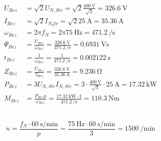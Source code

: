\documentclass[11pt,a4paper]{scrartcl}
\newcommand{\0}{_{\mybr{0}}}
\newcommand{\1}{_{\mybr{1}}}
\newcommand{\2}{_{\mybr{2}}}
\begin{document}
\subsection{}
\begin{align}
U_{Bez}&=\sqrt{2}U_{N,Str}=\sqrt{2}\frac{\SI{400}{\volt}}{\sqrt{3}}=\SI{326.6}{\volt}\\
I_{Bez}&=\sqrt{2}I_{N_Str}=\sqrt{2}\SI{25}\ampere=\SI{35.36}{\ampere}\\
\omega_{Bez}&=2\pi f_N=2 \pi \SI{75}{\hertz}=\SI{471.2}{\per\second}\\
\Psi_{Bez}&=\frac{U_{Bez}}{\omega_{Bez}}=\frac{\SI{326.6}{\volt}}{\SI{471.2}{\per\second}}=\SI{0.6931}{\volt\second}\\
t_{Bez}&=\frac{1}{\omega_{Bez}}=\frac{1}{\SI{471.2}{\per\second}}=\SI{0.002122}{\second}\\
Z_{Bez}&=\frac{U_{Bez}}{I_{Bez}}=\frac{\SI{326.6}{\volt}}{\SI{35.36}{\ampere}}=\SI{9.236}{\ohm}\\
P_{Bez}&=3U_{N,Str}I_{N,Str}=3\cdot\frac{\SI{400}{\volt}}{\sqrt{3}}\cdot\SI{25}{\ampere}=\SI{17.32}{\kilo\watt}\\
M_{Bez}&=\frac{P_{Bez}p}{\omega_{Bez}}=\frac{\SI{17.32}{\kilo\watt}\cdot 3}{\SI{471.2}{\per\second}}=\SI{110.3}{\newton\metre}
\end{align}

\subsection{}
\begin{equation}
n=\frac{f_N\cdot\SI{60}{\second\per\minute}}{p}=\frac{\SI{75}{\hertz}\cdot\SI{60}{\second\per\minute}}{3}=\SI{1500}{\per\minute}
\end{equation}
\end{document}
